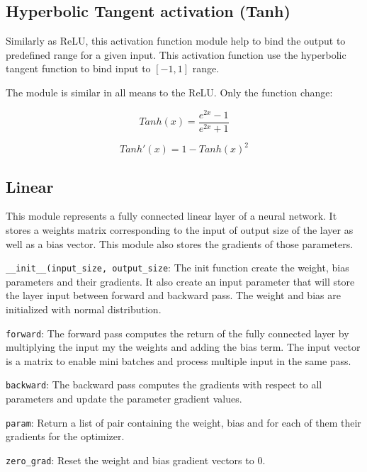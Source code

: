 \documentclass[10pt,conference,compsocconf]{IEEEtran}
\begin{document}
\subsection{Hyperbolic Tangent activation (Tanh)}

Similarly as ReLU, this activation function module help to bind the output to predefined range for a given input. This activation function use the hyperbolic tangent function to bind input to $[-1,1]$ range.

The module is similar in all means to the ReLU. Only the function change:


\begin{equation}
    Tanh(x) = \frac{e^{2x} - 1}{e^{2x} + 1}
\end{equation}



\begin{equation}
    Tanh'(x) = 1 - Tanh(x)^2
\end{equation}

\subsection{Linear}

This module represents a fully connected linear layer of a neural network. It stores a weights matrix corresponding to the input of output size of the layer as well as a bias vector. This module also stores the gradients of those parameters. 

\texttt{\_\_init\_\_(input\_size, output\_size}: The init function create the weight, bias parameters and their gradients. It also create an input parameter that will store the layer input between forward and backward pass. The weight and bias are initialized with normal distribution. 

\texttt{forward}: The forward pass computes the return of the fully connected layer by multiplying the input my the weights and adding the bias term. The input vector is a matrix to enable mini batches and process multiple input in the same pass.

\texttt{backward}: The backward pass computes the gradients with respect to all parameters and update the parameter gradient values. 

\texttt{param}: Return a list of pair containing the weight, bias and for each of them their gradients for the optimizer. 

\texttt{zero\_grad}: Reset the weight and bias gradient vectors to 0.
\end{document}
